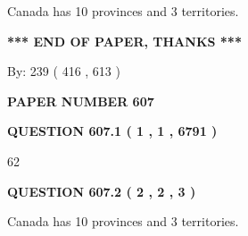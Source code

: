 \documentclass[12pt]{article}
\begin{document}
  
 
 
\noindent{}
 
 
Canada has 10  provinces and 3 territories.
 
 
 
 
   
   
 \vspace{0.2in}
 
   
   
   
   
\vspace{1.0in} 
{\textbf{\large{ *** END OF PAPER, THANKS *** }}} 
   
   
\hspace{1.0in} By: 
 239 ( 416 ,  613 )
   
   
   
   
\newpage 
\setcounter{page}{ 
   607001 } 
   
   
   
   
 {\textbf{ \Large{ PAPER NUMBER  607  }}}
   
   
\vspace{0.2in}
   
   
   
   
   
   
 \vspace{0.2in}
 
 
 
 
   
   
  
\vspace{0.2in}
  
{\textbf{\Large{QUESTION
607.1 
 ( 1 , 1 , 6791 )
}}}
  
  
 
 
\noindent{}

62
 
 
  
\vspace{0.2in}
  
{\textbf{\Large{QUESTION
607.2 
 ( 2 , 2 , 3 )
}}}
  
  
 
 
\noindent{}
 
 
Canada has 10  provinces and 3 territories.
 
\end{document}
